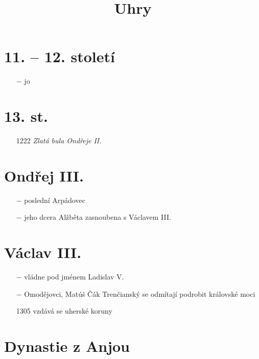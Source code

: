 \documentclass{article}
\title{\vspace{-2cm}Uhry\vspace{-1.7cm}}
\date{}
\author{}
\begin{document}
\maketitle

\section*{11. -- 12. století}
\begin{itemize}
    \vspace{-0.5em}
    \setlength\itemsep{0.15em}
    \item[$-$] jo
\end{itemize}

\section*{13. st.}
\begin{itemize}
    \vspace{-0.5em}
    \setlength\itemsep{0.15em}
    \item[1222] \textit{Zlatá bula Ondřeje II.}
\end{itemize}

\section*{Ondřej III.}
\begin{itemize}
    \vspace{-0.5em}
    \setlength\itemsep{0.15em}
    \item[$-$] poslední Arpádovec
    \item[$-$] jeho dcera Alžběta zasnoubena s Václavem III.
\end{itemize}

\section*{Václav III.}
\begin{itemize}
    \vspace{-0.5em}
    \setlength\itemsep{0.15em}
    \item[$-$] vládne pod jménem Ladislav V.
    \item[$-$] Omodějovci, Matúš Čák Trenčianský se odmítají podrobit královské moci
    \item[1305] vzdává se uherské koruny
\end{itemize}


\section*{Dynastie z Anjou}
\end{document}
